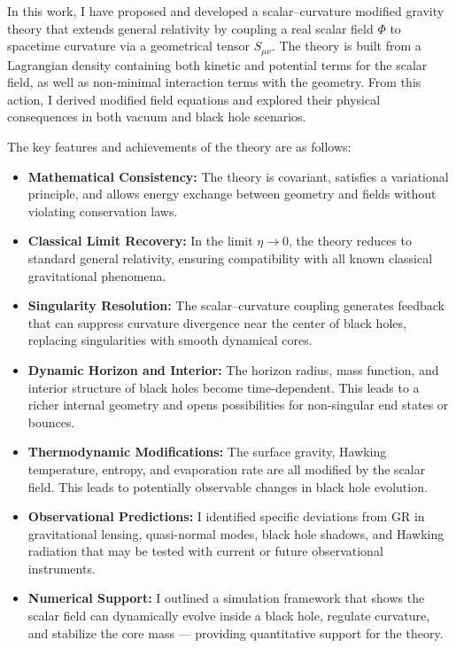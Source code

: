 \documentclass[12pt]{article}
\begin{document}
In this work, I have proposed and developed a scalar--curvature modified gravity theory that extends general relativity by coupling a real scalar field \( \Phi \) to spacetime curvature via a geometrical tensor \( S_{\mu\nu} \). The theory is built from a Lagrangian density containing both kinetic and potential terms for the scalar field, as well as non-minimal interaction terms with the geometry. From this action, I derived modified field equations and explored their physical consequences in both vacuum and black hole scenarios.

The key features and achievements of the theory are as follows:

\begin{itemize}
    \item \textbf{Mathematical Consistency:}  
    The theory is covariant, satisfies a variational principle, and allows energy exchange between geometry and fields without violating conservation laws.

    \item \textbf{Classical Limit Recovery:}  
    In the limit \( \eta \to 0 \), the theory reduces to standard general relativity, ensuring compatibility with all known classical gravitational phenomena.

    \item \textbf{Singularity Resolution:}  
    The scalar--curvature coupling generates feedback that can suppress curvature divergence near the center of black holes, replacing singularities with smooth dynamical cores.

    \item \textbf{Dynamic Horizon and Interior:}  
    The horizon radius, mass function, and interior structure of black holes become time-dependent. This leads to a richer internal geometry and opens possibilities for non-singular end states or bounces.

    \item \textbf{Thermodynamic Modifications:}  
    The surface gravity, Hawking temperature, entropy, and evaporation rate are all modified by the scalar field. This leads to potentially observable changes in black hole evolution.

    \item \textbf{Observational Predictions:}  
    I identified specific deviations from GR in gravitational lensing, quasi-normal modes, black hole shadows, and Hawking radiation that may be tested with current or future observational instruments.

    \item \textbf{Numerical Support:}  
    I outlined a simulation framework that shows the scalar field can dynamically evolve inside a black hole, regulate curvature, and stabilize the core mass — providing quantitative support for the theory.
\end{itemize}
\end{document}
